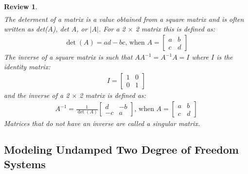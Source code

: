 \documentclass[12pt,letter]{article}
\numberwithin{ex}{section} %
\newtheorem{re}{Review}
\numberwithin{re}{section} %
\newenvironment{review}{\begin{mdframed}[middlelinewidth=2mm,roundcorner=20pt]\begin{re}\normalfont}{\end{re}\end{mdframed}}
\begin{document}
\begin{review}
\begin{eqnarray}
\end{eqnarray}
The determent of a matrix is a value obtained from a square matrix and is often written as det($A$), det $A$, or $|A|$. For a 2 $\times$ 2 matrix this is defined as:
\begin{eqnarray}
\det (A) = ad-bc  \text{, when } A = \begin{bmatrix} a & b \\ c & d \end{bmatrix}
\end{eqnarray}
The inverse of a square matrix is such that $AA^{-1} = A^{-1}A=I$ where $I$ is the identity matrix:
\begin{eqnarray}
I = \begin{bmatrix} 1 & 0 \\ 0 & 1 \end{bmatrix} 
\end{eqnarray}
and the inverse of a 2 $\times$ 2 matrix is defined as:
\begin{eqnarray}
A^{-1} = \frac{1}{\det (A)} \begin{bmatrix} d & -b \\ -c & a \end{bmatrix} \text{, when } A = \begin{bmatrix} a & b \\ c & d \end{bmatrix}
\end{eqnarray}
Matrices that do not have an inverse are called a singular matrix. 
\end{review}


\subsection{Modeling Undamped Two Degree of Freedom Systems}
\end{document}
